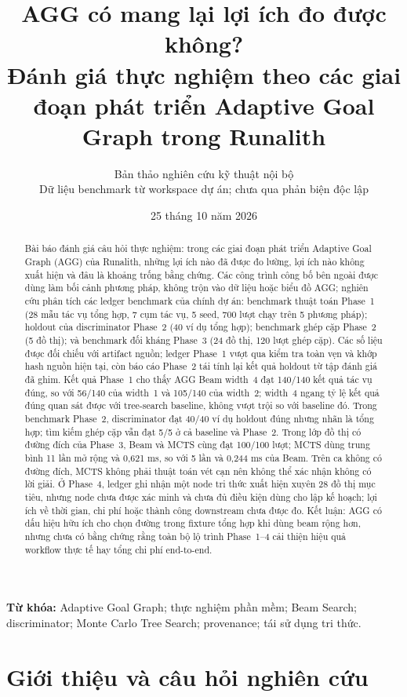 \documentclass[11pt,a4paper]{article}
\title{\vspace{-1.25cm}\color{aggblue}\bfseries AGG có mang lại lợi ích đo được không?\\[0.25em]
\large Đánh giá thực nghiệm theo các giai đoạn phát triển Adaptive Goal Graph trong Runalith}
\author{Bản thảo nghiên cứu kỹ thuật nội bộ\\\normalsize Dữ liệu benchmark từ workspace dự án; chưa qua phản biện độc lập}
\date{25 tháng 10 năm 2026}
\begin{document}
\maketitle
\renewcommand{\abstractname}{Tóm tắt}
\begin{abstract}
Bài báo đánh giá câu hỏi thực nghiệm: trong các giai đoạn phát triển Adaptive Goal Graph (AGG) của Runalith, những lợi ích nào đã được đo lường, lợi ích nào không xuất hiện và đâu là khoảng trống bằng chứng. Các công trình công bố bên ngoài được dùng làm bối cảnh phương pháp, không trộn vào dữ liệu hoặc biểu đồ AGG; nghiên cứu phân tích các ledger benchmark của chính dự án: benchmark thuật toán Phase~1 (28 mẫu tác vụ tổng hợp, 7 cụm tác vụ, 5 seed, 700 lượt chạy trên 5 phương pháp); holdout của discriminator Phase~2 (40 ví dụ tổng hợp); benchmark ghép cặp Phase~2 (5 đồ thị); và benchmark đối kháng Phase~3 (24 đồ thị, 120 lượt ghép cặp). Các số liệu được đối chiếu với artifact nguồn; ledger Phase~1 vượt qua kiểm tra toàn vẹn và khớp hash nguồn hiện tại, còn báo cáo Phase~2 tái tính lại kết quả holdout từ tập đánh giá đã ghim. Kết quả Phase~1 cho thấy AGG Beam width~4 đạt 140/140 kết quả tác vụ đúng, so với 56/140 của width~1 và 105/140 của width~2; width~4 ngang tỷ lệ kết quả đúng quan sát được với tree-search baseline, không vượt trội so với baseline đó. Trong benchmark Phase~2, discriminator đạt 40/40 ví dụ holdout đúng nhưng nhãn là tổng hợp; tìm kiếm ghép cặp vẫn đạt 5/5 ở cả baseline và Phase~2. Trong lớp đồ thị có đường đích của Phase~3, Beam và MCTS cùng đạt 100/100 lượt; MCTS dùng trung bình 11 lần mở rộng và 0,621 ms, so với 5 lần và 0,244 ms của Beam. Trên ca không có đường đích, MCTS không phải thuật toán vét cạn nên không thể xác nhận không có lời giải. Ở Phase~4, ledger ghi nhận một node tri thức xuất hiện xuyên 28 đồ thị mục tiêu, nhưng node chưa được xác minh và chưa đủ điều kiện dùng cho lập kế hoạch; lợi ích về thời gian, chi phí hoặc thành công downstream chưa được đo. Kết luận: AGG có dấu hiệu hữu ích cho chọn đường trong fixture tổng hợp khi dùng beam rộng hơn, nhưng chưa có bằng chứng rằng toàn bộ lộ trình Phase~1--4 cải thiện hiệu quả workflow thực tế hay tổng chi phí end-to-end.
\end{abstract}

\noindent\textbf{Từ khóa:} Adaptive Goal Graph; thực nghiệm phần mềm; Beam Search; discriminator; Monte Carlo Tree Search; provenance; tái sử dụng tri thức.

\section{Giới thiệu và câu hỏi nghiên cứu}
\end{document}
